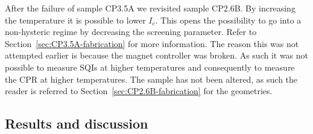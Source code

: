 After the failure of sample CP3.5A we revisited sample CP2.6B. By increasing the temperature it is possible to lower $I_c$. This opens the possibility to go into a non-hysteric regime by decreasing the screening parameter. Refer to Section~\ref{sec:CP3.5A-fabrication} for more information. The reason this was not attempted earlier is because the magnet controller was broken. As such it was not possible to measure SQIs at higher temperatures and consequently to measure the CPR at higher temperatures. The sample has not been altered, as such the reader is referred to Section~\ref{sec:CP2.6B-fabrication} for the geometries.

\subsection{Results and discussion}
